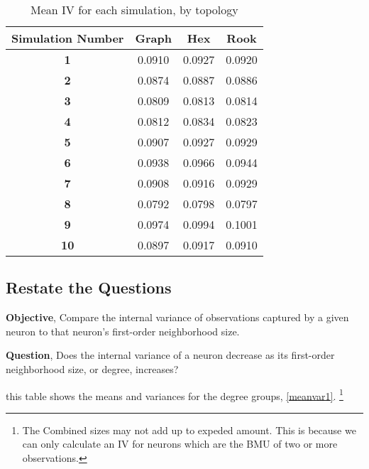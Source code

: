 \begin{table}
\centering
\caption{Mean IV for each simulation, by topology}
\label{ivtable3}
\begin{tabular}{|c||c|c|c|}
\hline
\textbf{Simulation Number} & Graph & Hex & Rook \\
\hline
\hline
\textbf{1} & 0.0910 & 0.0927 & 0.0920 \\
\hline
\textbf{2} & 0.0874 & 0.0887 & 0.0886 \\
\hline
\textbf{3} & 0.0809 & 0.0813 & 0.0814 \\
\hline
\textbf{4} & 0.0812 & 0.0834 & 0.0823 \\
\hline
\textbf{5} & 0.0907 & 0.0927 & 0.0929 \\
\hline
\textbf{6} & 0.0938 & 0.0966 & 0.0944 \\
\hline
\textbf{7} & 0.0908 & 0.0916 & 0.0929 \\
\hline
\textbf{8} & 0.0792 & 0.0798 & 0.0797 \\
\hline
\textbf{9} & 0.0974 & 0.0994 & 0.1001 \\
\hline
\textbf{10} & 0.0897 & 0.0917 & 0.0910 \\
\hline
\end{tabular} \end{table}



\subsection{Restate the Questions}
\textbf{Objective}, Compare the internal variance of observations captured by a given
neuron to that neuron's first-order neighborhood size.

\textbf{Question}, Does the internal variance of a neuron decrease as its first-order
neighborhood size, or degree, increases?



this table shows the means and variances for the degree groups,
\ref{meanvar1}. \footnote{The Combined sizes may not add up to expeded amount.
This is because we can only calculate an IV for neurons which are the BMU of
two or more observations.}

